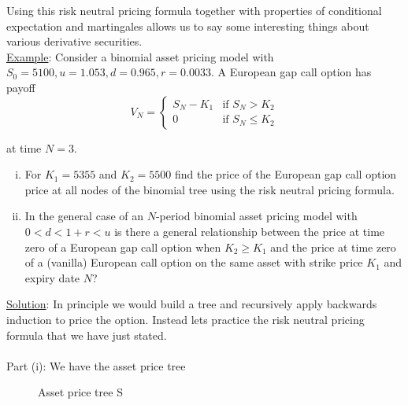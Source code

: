 \documentclass[12pt]{article}
\newlength\tindent
\renewcommand{\indent}{\hspace*{\tindent}}
\begin{document}
\indent Using this risk neutral pricing formula together with properties of conditional expectation and martingales allows us to say some interesting things about various derivative securities. \\

\underline{Example}: Consider a binomial asset pricing model with $S_0 = 5100, u = 1.053, d = 0.965, r = 0.0033$. A European gap call option has payoff
\begin{equation*}
	V_N = 
	\begin{cases}
		S_N - K_1 & \text{if } S_N > K_2 \\
		0 & \text{if } S_N \leq K_2
	\end{cases}
\end{equation*}

at time $N = 3$.

\begin{enumerate}[(i)]
	\item For $K_1 = 5355$ and $K_2 = 5500$ find the price of the European gap call option price at all nodes of the binomial tree using the risk neutral pricing formula.
	\item In the general case of an $N$-period binomial asset pricing model with $0 < d < 1 + r < u$ is there a general relationship between the price at time zero of a European gap call option when $K_2 \geq K_1$ and the price at time zero of a (vanilla) European call option on the same asset with strike price $K_1$ and expiry date $N$?
\end{enumerate}

\underline{Solution}: In principle we would build a tree and recursively apply backwards induction to price the option. Instead lets practice the risk neutral pricing formula that we have just stated.
\\
\\
Part (i): We have the asset price tree
\begin{figure}[H]
\caption{Asset price tree S}
\end{figure}
\end{document}
